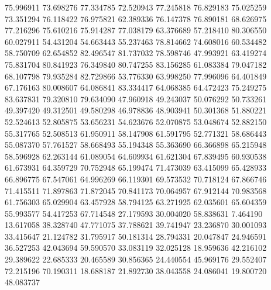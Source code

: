 75.996911
73.698276
77.334785
72.520943
77.245818
76.829183
75.025259
73.351294
76.118422
76.975821
62.389336
76.147378
76.890181
68.626975
77.216296
75.610216
75.914287
77.038179
63.376689
57.218410
80.306550
60.027911
54.431204
54.663443
55.237463
78.814662
74.608016
60.534482
58.750709
62.654852
82.496547
81.737032
78.598746
47.993921
63.419274
75.831704
80.841923
76.349840
80.747255
83.156285
61.083384
79.047182
68.107798
79.935284
82.729866
53.776330
63.998250
77.996096
64.401849
67.176163
80.008607
64.086841
83.334417
64.068385
64.472423
75.249275
83.637831
79.320810
79.634090
47.960918
49.243037
50.076292
50.733261
49.397420
49.312501
49.580298
46.978836
48.903941
50.301368
51.880221
52.524613
52.805875
53.656231
54.623676
52.070875
53.048674
52.882150
55.317765
52.508513
61.950911
58.147908
61.591795
52.771321
58.686443
55.087370
57.761527
58.668493
55.194348
55.363690
66.366898
65.215948
58.596928
62.263144
61.089054
64.609934
61.621304
67.839495
60.930538
61.673931
64.359729
70.752948
65.199474
71.473039
63.415099
65.428933
66.896775
67.547061
64.996269
66.119301
69.573532
70.718124
67.866746
71.415511
71.897863
71.872045
70.841173
70.064957
67.912144
70.983568
61.756303
65.029904
63.457928
58.794125
63.271925
62.035601
65.604359
55.993577
54.417253
67.714548
27.179593
30.004020
58.838631
7.464190
13.617058
38.328740
47.771075
37.788621
39.741947
23.236870
30.001093
33.415647
21.124782
31.795917
50.181314
28.794331
20.047847
24.946591
36.527253
42.043694
59.590570
33.083119
32.025128
18.959636
42.216102
29.389622
22.685333
20.465589
30.856365
24.440554
45.969176
29.552407
72.215196
70.190311
18.688187
21.892730
38.043558
24.086041
19.800720
48.083737
